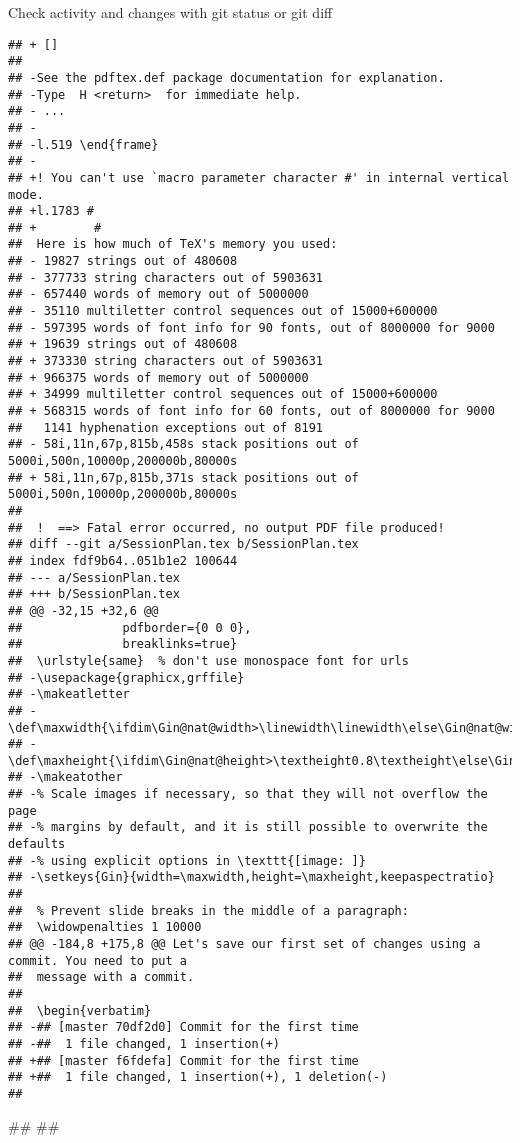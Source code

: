 \documentclass[ignorenonframetext,]{beamer}
\begin{document}
\begin{frame}[fragile]{Check activity and changes with git status or git
diff}
\begin{verbatim}
## + []
##  
## -See the pdftex.def package documentation for explanation.
## -Type  H <return>  for immediate help.
## - ...                                              
## -                                                  
## -l.519 \end{frame}
## -                  
## +! You can't use `macro parameter character #' in internal vertical mode.
## +l.1783 #
## +        # 
##  Here is how much of TeX's memory you used:
## - 19827 strings out of 480608
## - 377733 string characters out of 5903631
## - 657440 words of memory out of 5000000
## - 35110 multiletter control sequences out of 15000+600000
## - 597395 words of font info for 90 fonts, out of 8000000 for 9000
## + 19639 strings out of 480608
## + 373330 string characters out of 5903631
## + 966375 words of memory out of 5000000
## + 34999 multiletter control sequences out of 15000+600000
## + 568315 words of font info for 60 fonts, out of 8000000 for 9000
##   1141 hyphenation exceptions out of 8191
## - 58i,11n,67p,815b,458s stack positions out of 5000i,500n,10000p,200000b,80000s
## + 58i,11n,67p,815b,371s stack positions out of 5000i,500n,10000p,200000b,80000s
##  
##  !  ==> Fatal error occurred, no output PDF file produced!
## diff --git a/SessionPlan.tex b/SessionPlan.tex
## index fdf9b64..051b1e2 100644
## --- a/SessionPlan.tex
## +++ b/SessionPlan.tex
## @@ -32,15 +32,6 @@
##              pdfborder={0 0 0},
##              breaklinks=true}
##  \urlstyle{same}  % don't use monospace font for urls
## -\usepackage{graphicx,grffile}
## -\makeatletter
## -\def\maxwidth{\ifdim\Gin@nat@width>\linewidth\linewidth\else\Gin@nat@width\fi}
## -\def\maxheight{\ifdim\Gin@nat@height>\textheight0.8\textheight\else\Gin@nat@height\fi}
## -\makeatother
## -% Scale images if necessary, so that they will not overflow the page
## -% margins by default, and it is still possible to overwrite the defaults
## -% using explicit options in \texttt{[image: ]}
## -\setkeys{Gin}{width=\maxwidth,height=\maxheight,keepaspectratio}
##  
##  % Prevent slide breaks in the middle of a paragraph:
##  \widowpenalties 1 10000
## @@ -184,8 +175,8 @@ Let's save our first set of changes using a commit. You need to put a
##  message with a commit.
##  
##  \begin{verbatim}
## -## [master 70df2d0] Commit for the first time
## -##  1 file changed, 1 insertion(+)
## +## [master f6fdefa] Commit for the first time
## +##  1 file changed, 1 insertion(+), 1 deletion(-)
##  \end{verbatim}
##  
##  \end{frame}
\end{document}
